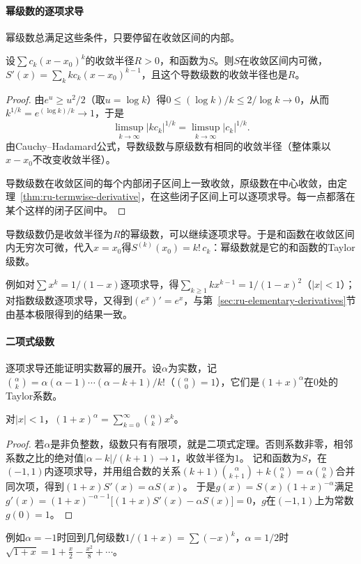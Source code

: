 \paragraph{幂级数的逐项求导}
幂级数总满足这些条件，只要停留在收敛区间的内部。
\begin{theorem}[幂级数的逐项求导]
\label{thm:ru-power-series-derivative}
设$\sum c_k(x-x_0)^k$的收敛半径$R>0$，和函数为$S$。则$S$在收敛区间内可微，$S'(x)=\sum_kkc_k(x-x_0)^{k-1}$，且这个导数级数的收敛半径也是$R$。
\end{theorem}
\begin{proof}
由$e^u\geq u^2/2$（取$u=\log k$）得$0\leq(\log k)/k\leq2/\log k\to0$，从而$k^{1/k}=e^{(\log k)/k}\to1$，于是
\[
 \limsup_{k\to\infty}|kc_k|^{1/k}=\limsup_{k\to\infty}|c_k|^{1/k}.
\]
由Cauchy--Hadamard公式，导数级数与原级数有相同的收敛半径（整体乘以$x-x_0$不改变收敛半径）。

导数级数在收敛区间的每个内部闭子区间上一致收敛，原级数在中心收敛，由定理~\ref{thm:ru-termwise-derivative}，在这些闭子区间上可以逐项求导。每一点都落在某个这样的闭子区间中。
\end{proof}
导数级数仍是收敛半径为$R$的幂级数，可以继续逐项求导。于是和函数在收敛区间内无穷次可微，代入$x=x_0$得$S^{(k)}(x_0)=k!\,c_k$：幂级数就是它的和函数的Taylor级数。

例如对$\sum x^k=1/(1-x)$逐项求导，得$\sum_{k\geq1}kx^{k-1}=1/(1-x)^2$（$|x|<1$）；对指数级数逐项求导，又得到$(e^x)'=e^x$，与第~\ref{sec:ru-elementary-derivatives}节由基本极限得到的结果一致。

\paragraph{二项式级数}
逐项求导还能证明实数幂的展开。设$\alpha$为实数，记$\binom\alpha k=\alpha(\alpha-1)\cdots(\alpha-k+1)/k!$（$\binom\alpha0=1$），它们是$(1+x)^\alpha$在$0$处的Taylor系数。
\begin{theorem}[二项式级数]
\label{thm:ru-binomial-series}
对$|x|<1$，$(1+x)^\alpha=\sum_{k=0}^\infty\binom\alpha kx^k$。
\end{theorem}
\begin{proof}
若$\alpha$是非负整数，级数只有有限项，就是二项式定理。否则系数非零，相邻系数之比的绝对值$|\alpha-k|/(k+1)\to1$，收敛半径为$1$。
记和函数为$S$，在$(-1,1)$内逐项求导，并用组合数的关系$(k+1)\binom\alpha{k+1}+k\binom\alpha k=\alpha\binom\alpha k$合并同次项，得到$(1+x)S'(x)=\alpha S(x)$。
于是$g(x)=S(x)(1+x)^{-\alpha}$满足$g'(x)=(1+x)^{-\alpha-1}\bigl[(1+x)S'(x)-\alpha S(x)\bigr]=0$，$g$在$(-1,1)$上为常数$g(0)=1$。
\end{proof}
例如$\alpha=-1$时回到几何级数$1/(1+x)=\sum(-x)^k$，$\alpha=1/2$时$\sqrt{1+x}=1+\tfrac x2-\tfrac{x^2}8+\cdots$。

